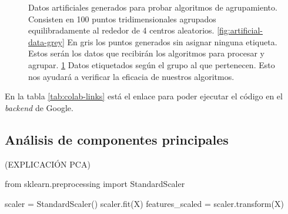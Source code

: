 \begin{figure}[h]
\begin{subfigure}{0.45\textwidth}
    \caption{}
    \label{fig:artificial-data-labeled}
  \end{subfigure}
  \caption[Datos artificiales para la prueba de algoritmos.]{Datos artificiales generados para probar algoritmos de agrupamiento. Consisten en 100 puntos tridimensionales agrupados equilibradamente al rededor de 4 centros aleatorios. \ref{fig:artificial-data-grey} En gris los puntos generados sin asignar ninguna etiqueta. Estos serán los datos que recibirán los algoritmos para procesar y agrupar. \ref{fig:artificial-data-labeled} Datos etiquetados según el grupo al que pertenecen. Esto nos ayudará a verificar la eficacia de nuestros algoritmos.}

  \label{fig:artificial-data}
\end{figure}

En la tabla \ref{tab:colab-links} está el enlace para poder ejecutar el código en el \textit{backend} de Google.

\newpage
\subsection{Análisis de componentes principales}
(EXPLICACIÓN PCA)

\begin{mypython}[float={h},caption={Escalar y estandarizar los datos.}]
  from sklearn.preprocessing import StandardScaler

  scaler = StandardScaler()
  scaler.fit(X)
  features_scaled = scaler.transform(X)
\end{mypython}

